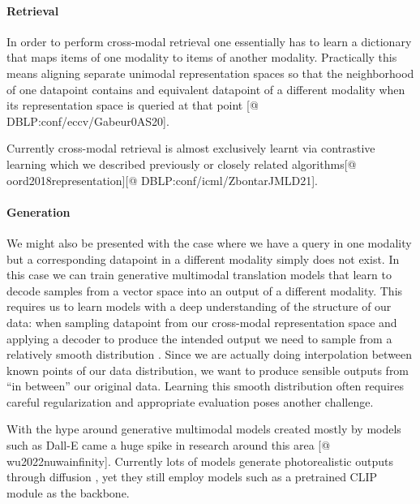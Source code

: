 \documentclass[
]{krantz}
\begin{document}
\hypertarget{retrieval}{%
\paragraph{Retrieval}\label{retrieval}}

In order to perform cross-modal retrieval one essentially has to learn a dictionary that maps items of one modality to items of another modality. Practically this means aligning separate unimodal representation spaces so that the neighborhood of one datapoint contains and equivalent datapoint of a different modality when its representation space is queried at that point \citep{shvetsova2021everything}{[}@ DBLP:conf/eccv/Gabeur0AS20{]}.

Currently cross-modal retrieval is almost exclusively learnt via contrastive learning which we described previously or closely related algorithms\citep{DBLP:conf/icml/ChenK0H20}{[}@ oord2018representation{]}{[}@ DBLP:conf/icml/ZbontarJMLD21{]}.

\hypertarget{generation}{%
\paragraph{Generation}\label{generation}}

We might also be presented with the case where we have a query in one modality but a corresponding datapoint in a different modality simply does not exist. In this case we can train generative multimodal translation models that learn to decode samples from a vector space into an output of a different modality. This requires us to learn models with a deep understanding of the structure of our data: when sampling datapoint from our cross-modal representation space and applying a decoder to produce the intended output we need to sample from a relatively smooth distribution \citep{DBLP:journals/jstsp/ZhangYHD20}. Since we are actually doing interpolation between known points of our data distribution, we want to produce sensible outputs from ``in between'' our original data. Learning this smooth distribution often requires careful regularization and appropriate evaluation poses another challenge\citep{baltrušaitis2017multimodal}.

With the hype around generative multimodal models created mostly by models such as Dall-E \citep{DBLP:conf/icml/RameshPGGVRCS21} came a huge spike in research around this area \citep{saharia2022photorealistic}{[}@ wu2022nuwainfinity{]}. Currently lots of models generate photorealistic outputs through diffusion \citep{DBLP:conf/nips/HoJA20}, yet they still employ models such as a pretrained CLIP \citep{DBLP:conf/icml/RadfordKHRGASAM21} module as the backbone.
\end{document}
